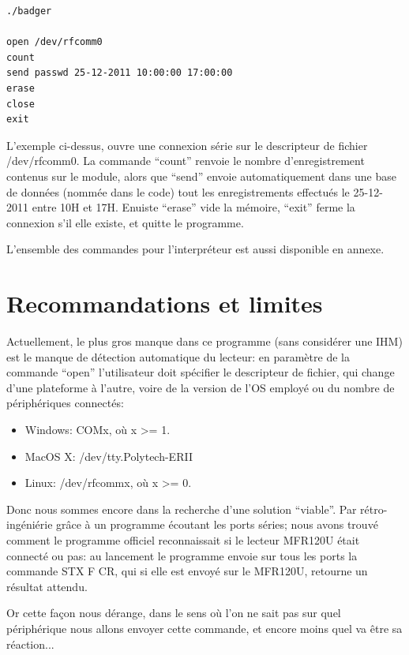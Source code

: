     \begin{lstlisting}
./badger

open /dev/rfcomm0
count
send passwd 25-12-2011 10:00:00 17:00:00
erase
close
exit
    \end{lstlisting}

L'exemple ci-dessus, ouvre une connexion série sur le descripteur de fichier
/dev/rfcomm0. La commande ``count'' renvoie le nombre d'enregistrement contenus sur 
le module, alors que ``send'' envoie automatiquement dans une base de données (nommée
dans le code) tout les enregistrements effectués le 25-12-2011 entre 10H et 17H.
Enuiste ``erase'' vide la mémoire, ``exit'' ferme la connexion s'il elle existe, et
quitte le programme.

L'ensemble des commandes pour l'interpréteur est aussi disponible en annexe.


    \section{Recommandations et limites}
Actuellement, le plus gros manque dans ce programme (sans considérer une IHM) est
le manque de détection automatique du lecteur: en paramètre de la commande ``open''
l'utilisateur doit spécifier le descripteur de fichier, qui change d'une plateforme
à l'autre, voire de la version de l'OS employé ou du nombre de périphériques connectés:

    \begin{itemize}
    \item Windows: COMx, où x >= 1.
    \item MacOS X: /dev/tty.Polytech-ERII
    \item Linux: /dev/rfcommx, où x >= 0.
    \end{itemize}

Donc nous sommes encore dans la recherche d'une solution ``viable''. Par
rétro-ingéniérie grâce à un programme écoutant les ports séries; nous avons
trouvé comment le programme officiel reconnaissait si le lecteur MFR120U était 
connecté ou pas: au lancement le programme envoie sur tous les ports la commande
STX F CR, qui si elle est envoyé sur le MFR120U, retourne un résultat attendu.

Or cette façon nous dérange, dans le sens où l'on ne sait pas sur quel périphérique
nous allons envoyer cette commande, et encore moins quel va être sa réaction...

